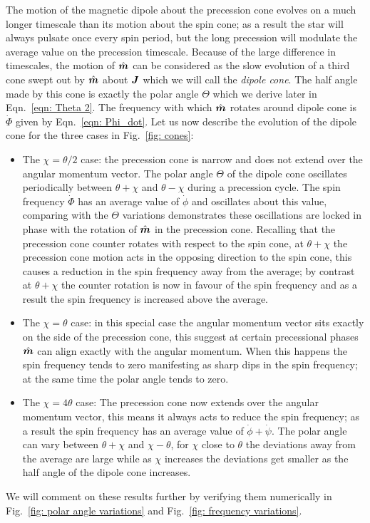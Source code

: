\documentclass[../full_thesis/full_thesis.tex]{subfiles}
\begin{document}
The motion of the magnetic dipole about the precession cone evolves on a much
longer timescale than its motion about the spin cone; as a result the star will
always pulsate once every spin period, but the long precession will modulate
the average value on the precession timescale. Because of the large difference
in timescales, the motion of $\hat{\boldsymbol{m}}$ can be considered as the slow evolution of a
third cone swept out by $\hat{\boldsymbol{m}}$ about $\boldsymbol{J}$ which we will call the \emph{dipole cone}. The
half angle made by this cone is exactly the polar angle $\Theta$ which we derive
later in Eqn.~\eqref{eqn: Theta 2}. The frequency with which $\hat{\boldsymbol{m}}$ rotates around
dipole cone is $\dot{\Phi}$ given by Eqn.~\eqref{eqn: Phi_dot}. Let us now
describe the evolution of the dipole cone for the three cases in Fig.~\ref{fig: cones}:
\begin{itemize}
\item The $\chi = \theta/2$ case: the precession cone is narrow and does not
extend over the angular momentum vector. The polar angle $\Theta$ of the dipole
cone oscillates periodically between $\theta+\chi$ and $\theta-\chi$
during a precession cycle. The spin frequency $\dot{\Phi}$ has an average value
of $\dot{\phi}$ and
oscillates about this value, comparing with the $\Theta$ variations
demonstrates these oscillations are locked in phase with the rotation of $\hat{\boldsymbol{m}}$
in the precession cone. Recalling that the precession cone counter rotates with
respect to the spin cone, at $\theta+\chi$ the precession cone motion acts in
the opposing direction to the spin cone, this causes a reduction in the spin
frequency away from the average; by contrast at $\theta+\chi$ the counter
rotation is now in favour of the spin frequency and as a result the spin
frequency is increased above the average.

\item The $\chi = \theta$ case: in this special case the angular momentum vector sits exactly
on the side of the precession cone, this suggest at certain precessional phases $\hat{\boldsymbol{m}}$ can align exactly with
the angular momentum. When this happens the spin frequency tends to zero manifesting as sharp dips in the
spin frequency; at the same time the polar angle tends to zero.

\item The $\chi = 4\theta$ case: The precession cone now extends over the
angular momentum vector, this means it always acts to reduce the spin
frequency; as a result the spin frequency has an average value of
$\dot{\phi} + \dot{\psi}$. The polar angle can vary between $\theta+\chi$ and
$\chi-\theta$, for $\chi$ close to $\theta$ the deviations away from the
average are large while as $\chi$ increases the deviations get smaller as
the half angle of the dipole cone increases.
\end{itemize}
We will comment on these results further by verifying them numerically in
Fig.~\ref{fig: polar angle variations} and Fig.~\ref{fig: frequency variations}.
\end{document}
